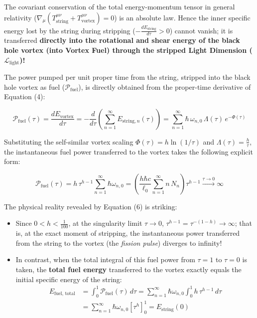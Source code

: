 \documentclass[12pt,a4paper]{article}
\begin{document}
The covariant conservation of the total energy-momentum tensor in general relativity ($\nabla_\mu \left( T^{\mu\nu}_{\text{string}} + T^{\mu\nu}_{\text{vortex}} \right) = 0$) is an absolute law. Hence the inner specific energy lost by the string during stripping ($-\frac{d E_{\text{string}}}{d\tau} > 0$) cannot vanish; it is transferred \textbf{directly into the rotational and shear energy of the black hole vortex (into Vortex Fuel) through the stripped Light Dimension ($\mathcal{L}_{\text{light}}$)!}

The power pumped per unit proper time from the string, stripped into the black hole vortex as fuel ($\mathcal{P}_{\text{fuel}}$), is directly obtained from the proper-time derivative of Equation (4):

\begin{equation}
\mathcal{P}_{\text{fuel}}(\tau) = \frac{d E_{\text{vortex}}}{d\tau} = -\frac{d}{d\tau} \left( \sum_{n=1}^{\infty} E_{\text{string}, n}(\tau) \right) = \sum_{n=1}^{\infty} \hbar \, \omega_{n,0} \, \Lambda(\tau) \, e^{-\Phi(\tau)}
\end{equation}

Substituting the self-similar vortex scaling $\Phi(\tau) = h \ln(1/\tau)$ and $\Lambda(\tau) = \frac{h}{\tau}$, the instantaneous fuel power transferred to the vortex takes the following explicit form:

\begin{equation}
\mathcal{P}_{\text{fuel}}(\tau) = h \, \tau^{h - 1} \sum_{n=1}^{\infty} \hbar \omega_{n,0} = \left( \frac{h \hbar c}{\ell_0} \sum_{n=1}^{\infty} n \, N_n \right) \tau^{h - 1} \xrightarrow{\tau \to 0} \infty
\end{equation}

The physical reality revealed by Equation (6) is striking:
\begin{itemize}
    \item Since $0 < h < \frac{1}{100}$, at the singularity limit $\tau \to 0$, $\tau^{h-1} = \tau^{-(1-h)} \to \infty$; that is, at the exact moment of stripping, the instantaneous power transferred from the string to the vortex (the \textit{fission pulse}) diverges to infinity!
    \item In contrast, when the total integral of this fuel power from $\tau = 1$ to $\tau = 0$ is taken, the \textbf{total fuel energy} transferred to the vortex exactly equals the initial specific energy of the string:
    \begin{equation}
    \begin{aligned}
    E_{\text{fuel, total}} &= \int_0^1 \mathcal{P}_{\text{fuel}}(\tau) \, d\tau = \sum_{n=1}^{\infty} \hbar \omega_{n,0} \int_0^1 h \, \tau^{h-1} \, d\tau \\
    &= \sum_{n=1}^{\infty} \hbar \omega_{n,0} \left[ \tau^h \right]_0^1 = E_{\text{string}}(0)
    \end{aligned}
    \end{equation}
\end{itemize}
\end{document}
